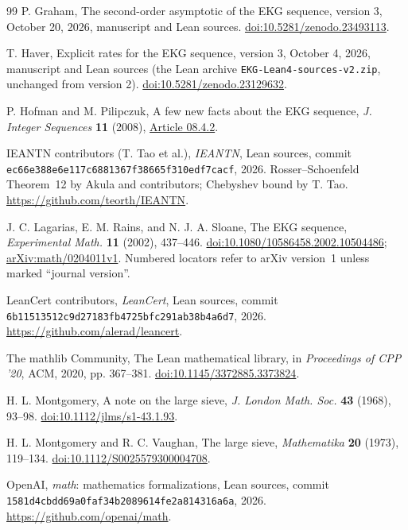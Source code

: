 \documentclass[11pt]{article}
\theoremstyle{definition}
\theoremstyle{remark}
\begin{document}
\begin{thebibliography}{99}
P. Graham, The second-order asymptotic of the EKG sequence, version 3,
October 20, 2026, manuscript and Lean sources.
\href{https://doi.org/10.5281/zenodo.23493113}{doi:10.5281/zenodo.23493113}.

T. Haver, Explicit rates for the EKG sequence, version 3,
October 4, 2026, manuscript and Lean sources (the Lean archive
\texttt{EKG-Lean4-sources-v2.zip}, unchanged from version 2).
\href{https://doi.org/10.5281/zenodo.23129632}{doi:10.5281/zenodo.23129632}.

P. Hofman and M. Pilipczuk, A few new facts about the EKG sequence,
\emph{J. Integer Sequences} \textbf{11} (2008),
\href{https://cs.uwaterloo.ca/journals/JIS/VOL11/Hofman/hofman1.html}{Article 08.4.2}.

IEANTN contributors (T. Tao et al.), \emph{IEANTN}, Lean sources,
commit \texttt{ec66e388e6e117c6881367f38665f310edf7cacf}, 2026. Rosser--Schoenfeld Theorem~12 by
Akula and contributors; Chebyshev bound by T. Tao.
\url{https://github.com/teorth/IEANTN}.

J. C. Lagarias, E. M. Rains, and N. J. A. Sloane,
The EKG sequence, \emph{Experimental Math.} \textbf{11} (2002), 437--446.
\href{https://doi.org/10.1080/10586458.2002.10504486}{doi:10.1080/10586458.2002.10504486};
\href{https://arxiv.org/abs/math/0204011v1}{arXiv:math/0204011v1}.
Numbered locators refer to arXiv version~1 unless marked ``journal version''.

LeanCert contributors, \emph{LeanCert}, Lean sources, commit
\texttt{6b11513512c9d27183fb4725bfc291ab38b4a6d7}, 2026. \url{https://github.com/alerad/leancert}.

The mathlib Community, The Lean mathematical library, in
\emph{Proceedings of CPP '20}, ACM, 2020, pp. 367--381.
\href{https://doi.org/10.1145/3372885.3373824}{doi:10.1145/3372885.3373824}.

H. L. Montgomery, A note on the large sieve,
\emph{J. London Math. Soc.} \textbf{43} (1968), 93--98.
\href{https://doi.org/10.1112/jlms/s1-43.1.93}{doi:10.1112/jlms/s1-43.1.93}.

H. L. Montgomery and R. C. Vaughan, The large sieve,
\emph{Mathematika} \textbf{20} (1973), 119--134.
\href{https://doi.org/10.1112/S0025579300004708}{doi:10.1112/S0025579300004708}.

OpenAI, \emph{math}: mathematics formalizations, Lean sources, commit
\texttt{1581d4cbdd69a0faf34b2089614fe2a814316a6a}, 2026. \url{https://github.com/openai/math}.


\end{thebibliography}
\end{document}

